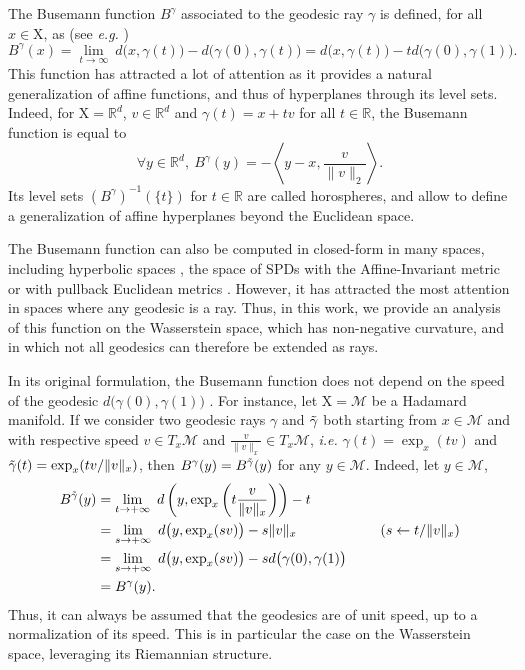 \documentclass[twoside]{article}
\newcommand{\cM}{\mathcal{M}}
\newcommand{\R}{\mathbb{R}}
\newcommand{\X}{\mathrm{X}}
\begin{document}
The Busemann function $B^\gamma$ associated to the geodesic ray $\gamma$ is defined, for all $x\in\X$, as (see \emph{e.g.} \citep[II. 8.17]{bridson2013metric})
\begin{equation}
    B^\gamma(x) = \lim_{t\to \infty}\ d\big(x,\gamma(t)\big) - d\big(\gamma(0),\gamma(t)\big) = d\big(x, \gamma(t)\big) - t d\big(\gamma(0),\gamma(1)\big).
\end{equation}
This function has attracted a lot of attention as it provides a natural generalization of affine functions, and thus of hyperplanes through its level sets. Indeed, for $\X=\R^d$, $v\in\R^d$ and $\gamma(t)=x + tv$ for all $t\in \R$, the Busemann function is equal to
\begin{equation}
    \forall y\in \R^d,\ B^\gamma(y) = -\left\langle y-x, \frac{v}{\|v\|_2} \right\rangle.
\end{equation}
Its level sets $(B^\gamma)^{-1}(\{t\})$ for $t\in \R$ are called horospheres, and allow to define a generalization of affine hyperplanes beyond the Euclidean space.

The Busemann function can also be computed in closed-form in many spaces, including hyperbolic spaces \citep{chami2021horopca, bonet2023hyperbolic}, the space of SPDs with the Affine-Invariant metric \citep{fletcher2009computing, fletcher2011horoball} or with pullback Euclidean metrics \citep{bonet2025sliced}. However, it has attracted the most attention in spaces where any geodesic is a ray. Thus, in this work, we provide an analysis of this function on the Wasserstein space, which has non-negative curvature, and in which not all geodesics can therefore be extended as rays.


In its original formulation, the Busemann function does not depend on the speed of the geodesic $d\big(\gamma(0),\gamma(1)\big)$ \citep{criscitiello2025horospherically}. For instance, let $\X=\cM$ be a Hadamard manifold. If we consider two geodesic rays $\gamma$ and $\Tilde{\gamma}$ both starting from $x\in\cM$ and with respective speed $v\in T_x\cM$ and $\frac{v}{\|v\|_x}\in T_x\cM$, \emph{i.e.} $\gamma(t)=\exp_x(tv)$ and $\Tilde{\gamma}(t)=\exp_x(tv/\|v\|_x)$, then $B^\gamma(y)=B^{\Tilde{\gamma}}(y)$ for any $y\in \cM$. Indeed, let $y\in \cM$,
\begin{equation}
    \begin{aligned}
        B^{\Tilde{\gamma}}(y) &= \lim_{t\to +\infty}\ d\left(y, \exp_x\left(t\frac{v}{\|v\|_x}\right)\right) - t \\
        &= \lim_{s\to +\infty}\ d\big(y, \exp_x(sv)\big) - s\|v\|_x \qquad \qquad \qquad \text{($s\leftarrow t/\|v\|_x$)} \\
        &= \lim_{s\to +\infty}\ d\big(y, \exp_x(sv)\big) - s d\big(\gamma(0),\gamma(1)\big) \\
        &= B^\gamma(y).
    \end{aligned}
\end{equation}
Thus, it can always be assumed that the geodesics are of unit speed, up to a normalization of its speed. This is in particular the case on the Wasserstein space, leveraging its Riemannian structure.
\end{document}
